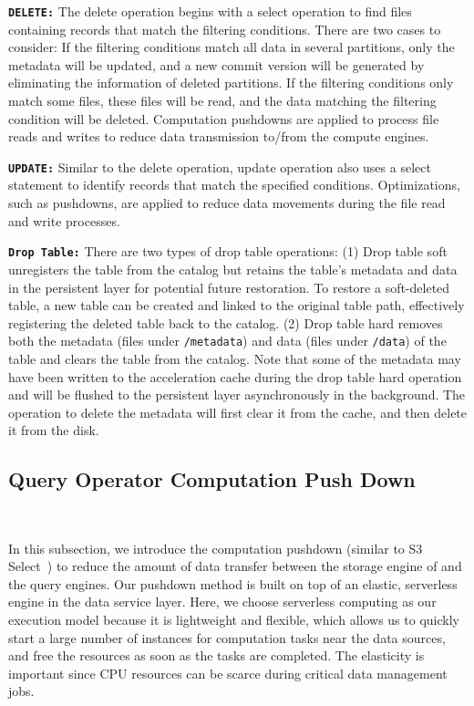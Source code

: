\noindent \textbf{\texttt{DELETE:}} The delete operation begins with a select operation to find files containing records that match the filtering conditions. There are two cases to consider:
If the filtering conditions match all data in several partitions, only the metadata will be updated, and a new commit version will be generated by eliminating the information of deleted partitions.
If the filtering conditions only match some files, these files will be read, and the data matching the filtering condition will be deleted. Computation pushdowns are applied to process file reads and writes to reduce data transmission to/from the compute engines.


\noindent \textbf{\texttt{UPDATE:}} Similar to the delete operation, update operation also uses a select statement to identify records that match the specified conditions. Optimizations, such as pushdowns, are applied to reduce data movements during the file read and write processes.

\noindent \textbf{\texttt{Drop Table:}} There are two types of drop table operations:
 (1) Drop table soft unregisters the table from the catalog but retains the table's metadata and data in the persistent layer for potential future restoration. To restore a soft-deleted table, a new table can be created and linked to the original table path, effectively registering the deleted table back to the catalog.
(2) Drop table hard  removes both the metadata (files under \texttt{/metadata}) and data (files under \texttt{/data}) of the table and clears the table from the catalog. Note that some of the metadata may have been written to the acceleration cache during the drop table hard operation and will be flushed to the persistent layer asynchronously in the background. The operation to delete the metadata will first clear it from the cache, and then delete it from the disk.

\subsection{Query Operator Computation Push Down}~\label{subsec:pushdown}




In this subsection, we introduce the computation pushdown (similar to S3 Select~\cite{s3}) to reduce the amount of data transfer between the  storage engine of \sys and the query engines.  Our pushdown method is built on top of an elastic, serverless engine in the data service layer. Here, we choose serverless computing as our execution model because it is lightweight  and flexible, which allows us to quickly start a large number of instances for computation tasks near the data sources, and free the resources as soon as the tasks are completed. The elasticity is important since CPU resources can be scarce during critical data management jobs.

